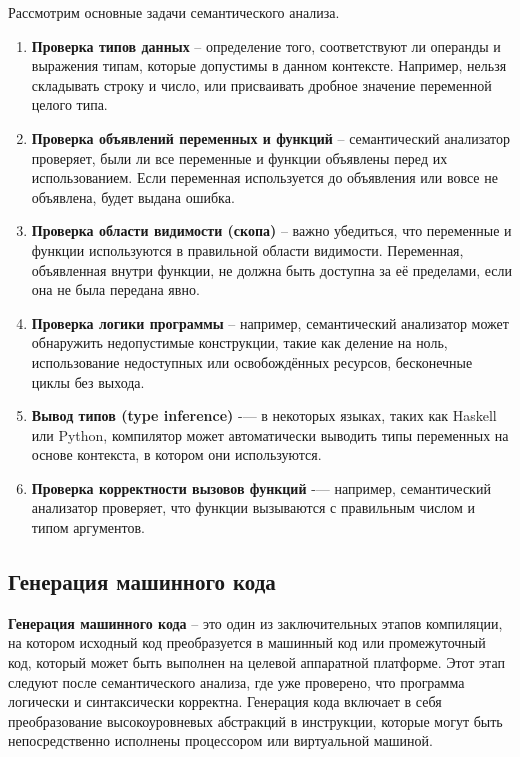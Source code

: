 Рассмотрим основные задачи семантического анализа.
\begin{enumerate}
  \item \textbf{Проверка типов данных} -- определение того, соответствуют ли операнды и выражения типам, которые допустимы в данном контексте. Например, нельзя складывать строку и число, или присваивать дробное значение переменной целого типа.
  \item \textbf{Проверка объявлений переменных и функций} -- семантический анализатор проверяет, были ли все переменные и функции объявлены перед их использованием. Если переменная используется до объявления или вовсе не объявлена, будет выдана ошибка.
  \item \textbf{Проверка области видимости (скопа)} -- важно убедиться, что переменные и функции используются в правильной области видимости. Переменная, объявленная внутри функции, не должна быть доступна за её пределами, если она не была передана явно.
  \item \textbf{Проверка логики программы} -- например, семантический анализатор может обнаружить недопустимые конструкции, такие как деление на ноль, использование недоступных или освобождённых ресурсов, бесконечные циклы без выхода.
  \item \textbf{Вывод типов (type inference)} -— в некоторых языках, таких как Haskell или Python, компилятор может автоматически выводить типы переменных на основе контекста, в котором они используются.
  \item \textbf{Проверка корректности вызовов функций} -— например, семантический анализатор проверяет, что функции вызываются с правильным числом и типом аргументов.
\end{enumerate}


\subsection{Генерация машинного кода}

\textbf{Генерация машинного кода} \cite{code-generation} -- это один из заключительных этапов компиляции, на котором исходный код преобразуется в машинный код или промежуточный код, который может быть выполнен на целевой аппаратной платформе. Этот этап следуют после семантического анализа, где уже проверено, что программа логически и синтаксически корректна. Генерация кода включает в себя преобразование высокоуровневых абстракций в инструкции, которые могут быть непосредственно исполнены процессором или виртуальной машиной.

